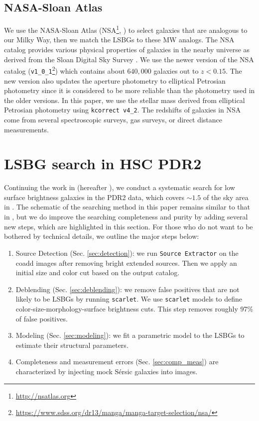\documentclass[twocolumn,astrosymb,twocolappendix]{aastex631}
\newcommand{\code}[1]{\texttt{#1}}
\newcommand{\sersic}{S\'ersic}
\begin{document}
\begin{CJK*}{UTF8}{gbsn}
\subsection{NASA-Sloan Atlas}
We use the NASA-Sloan Atlas (NSA\footnote{\url{http://nsatlas.org}}, \citealt{Blanton2005,Blanton2011}) to select galaxies that are analogous to our Milky Way, then we match the LSBGs to these MW analogs. The NSA catalog provides various physical properties of galaxies in the nearby universe as derived from the Sloan Digital Sky Survey \citep[SDSS,][]{York2000}. We use the newer version of the NSA catalog (\code{v1\_0\_1}\footnote{\url{https://www.sdss.org/dr13/manga/manga-target-selection/nsa/}}) which contains about $640,000$ galaxies out to $z < 0.15$. The new version also updates the aperture photometry to elliptical Petrosian photometry since it is considered to be more reliable than the photometry used in the older versions. In this paper, we use the stellar mass derived from elliptical Petrosian photometry using \code{kcorrect v4\_2}. The redshifts of galaxies in NSA come from several spectroscopic surveys, gas surveys, or direct distance measurements. 

\section{LSBG search in HSC PDR2}
Continuing the work in \citet{Greco2018} (hereafter ), we conduct a systematic search for low surface brightness galaxies in the PDR2 data, which covers $\sim 1.5$ of the sky area in . The schematic of the searching method in this paper remains similar to that in , but we do improve the searching completeness and purity by adding several new steps, which are highlighted in this section. For those who do not want to be bothered by technical details, we outline the major steps below:
\begin{enumerate}
    \item Source Detection (Sec. \ref{sec:detection}): we run \code{Source Extractor} on the coadd images after removing bright extended sources. Then we apply an initial size and color cut based on the output catalog. 
    \item Deblending (Sec. \ref{sec:deblending}): we remove false positives that are not likely to be LSBGs by running \code{scarlet}. We use \code{scarlet} models to define color-size-morphology-surface brightness cuts. This step removes roughly 97\% of false positives.
    \item Modeling (Sec. \ref{sec:modeling}): we fit a parametric model to the LSBGs to estimate their structural parameters. 
    \item Completeness and measurement errors (Sec. \ref{sec:comp_meas}) are characterized by injecting mock \sersic{} galaxies into images. 
\end{enumerate}


\end{CJK*}
\end{document}
